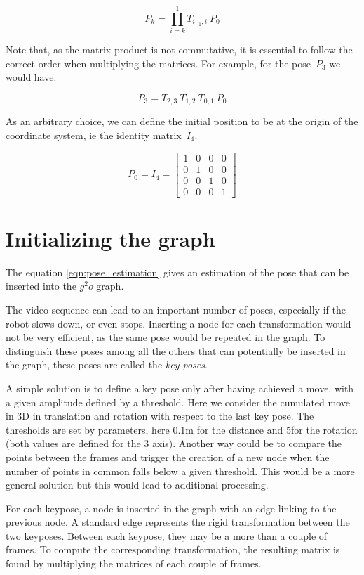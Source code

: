 \begin{equation}
P_k = \prod_{i=k}^1{T_{i_{-1},i}} \: P_0
\label{eqn:pose_estimation}
\end{equation}

Note that, as the matrix product is not commutative, it is essential to follow the correct order when multiplying the matrices. For example, for the pose~$P_3$ we would have:

\[
P_3 = T_{2,3} \: T_{1,2} \: T_{0,1} \: P_0
\]

As an arbitrary choice, we can define the initial position to be at the origin of the coordinate system, ie the identity matrix~$I_4$.

\[
P_0 = I_4 = \left[ \begin{array}{cccc}
1 & 0 & 0 & 0 \\
0 & 1 & 0 & 0 \\
0 & 0 & 1 & 0 \\
0 & 0 & 0 & 1 \end{array} \right] 
\]

\section{Initializing the graph}

The equation \ref{eqn:pose_estimation} gives an estimation of the pose that can be inserted into the $g^2o$ graph.

The video sequence can lead to an important number of poses, especially if the robot slows down, or even stops. Inserting a node for each transformation would not be very efficient, as the same pose would be repeated in the graph. To distinguish these poses among all the others that can potentially be inserted in the graph, these poses are called the \emph{key poses}. 

A simple solution is to define a key pose only after having achieved a move, with a given amplitude defined by a threshold. Here we consider the cumulated move in 3D in translation and rotation with respect to the last key pose. The thresholds are set by parameters, here 0.1m for the distance and 5\textdegree for the rotation (both values are defined for the 3 axis). Another way could be to compare the points between the frames and trigger the creation of a new node when the number of points in common falls below a given threshold. This would be a more general solution but this would lead to additional processing.

For each keypose, a node is inserted in the graph with an edge linking to the previous node. A standard edge represents the rigid transformation between the two keyposes. Between each keypose, they may be a more than a couple of frames. To compute the corresponding transformation, the resulting matrix is found by multiplying the matrices of each couple of frames.

